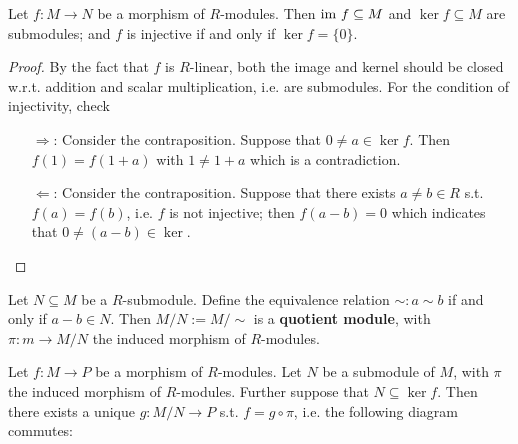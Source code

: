 \begin{proposition}\label{prop:R-module morphism injective iff kernel is 0}
    Let $f: M\to N$ be a morphism of $R$-modules. Then $\mathrm{im}\  f\subseteq M$ and $\ker f \subseteq M$ are submodules; and $f$ is injective if and only if $\ker f = \{0\}$. 
\end{proposition}

\begin{proof}
    By the fact that $f$ is $R$-linear, both the image and kernel should be closed w.r.t. addition and scalar multiplication, i.e. are submodules. For the condition of injectivity, check
    \begin{itemize}
        \item[$\Rightarrow$:] Consider the contraposition. Suppose that $0 \neq a\in\ker f$. Then $f(1) = f(1 + a)$ with $1 \neq 1+a$ which is a contradiction.
        \item[$\Leftarrow$:] Consider the contraposition. Suppose that there exists $a \neq b \in R$ s.t. $f(a) = f(b)$, i.e. $f$ is not injective; then $f(a-b) = 0$ which indicates that $0 \neq (a - b)\in \ker $. 
    \end{itemize}
\end{proof}

\begin{definition}
    Let $N\subseteq M$ be a $R$-submodule. Define the equivalence relation $\sim: a\sim b$ if and only if $a - b \in N$. Then $M/N := M/\sim$ is a \textbf{quotient module}, with $\pi: m \to M/N$ the induced morphism of $R$-modules. 
\end{definition}

\begin{theorem}
    \label{thm:Universal Property of Quotient Modules}
    Let $f: M\to P$ be a morphism of $R$-modules. Let $N$ be a submodule of $M$, with $\pi$ the induced morphism of $R$-modules. Further suppose that $N \subseteq \ker f$. Then there exists a unique $g: M/N \to P$ s.t. $f = g\circ \pi$, i.e. the following diagram commutes:
    
    \begin{minipage}{\linewidth}
        \centering
    \end{minipage}
\end{theorem}

